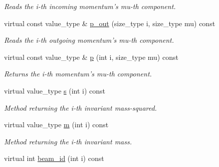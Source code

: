 \begin{DoxyCompactItemize}
\begin{DoxyCompactList}\small\item\em Reads the i-\/th incoming momentum's mu-\/th component. \end{DoxyCompactList}\item 
\hypertarget{a00442_a6ca6d42c507ab098658c2395ecf7a226}{virtual const value\-\_\-type \& \hyperlink{a00442_a6ca6d42c507ab098658c2395ecf7a226}{p\-\_\-out} (size\-\_\-type i, size\-\_\-type mu) const }\label{a00442_a6ca6d42c507ab098658c2395ecf7a226}

\begin{DoxyCompactList}\small\item\em Reads the i-\/th outgoing momentum's mu-\/th component. \end{DoxyCompactList}\item 
\hypertarget{a00442_ae50c1bc5dffde20bc9cfadb235c5b0e8}{virtual const value\-\_\-type \& \hyperlink{a00442_ae50c1bc5dffde20bc9cfadb235c5b0e8}{p} (int i, size\-\_\-type mu) const }\label{a00442_ae50c1bc5dffde20bc9cfadb235c5b0e8}

\begin{DoxyCompactList}\small\item\em Returns the i-\/th momentum's mu-\/th component. \end{DoxyCompactList}\item 
\hypertarget{a00442_a871734b21e34bf0b091362b93bf3e7d1}{virtual value\-\_\-type \hyperlink{a00442_a871734b21e34bf0b091362b93bf3e7d1}{s} (int i) const }\label{a00442_a871734b21e34bf0b091362b93bf3e7d1}

\begin{DoxyCompactList}\small\item\em Method returning the i-\/th invariant mass-\/squared. \end{DoxyCompactList}\item 
\hypertarget{a00442_abdc1d4c568e4e3b815064c3d639ad913}{virtual value\-\_\-type \hyperlink{a00442_abdc1d4c568e4e3b815064c3d639ad913}{m} (int i) const }\label{a00442_abdc1d4c568e4e3b815064c3d639ad913}

\begin{DoxyCompactList}\small\item\em Method returning the i-\/th invariant mass. \end{DoxyCompactList}\item 
\hypertarget{a00442_ab846d190acfc2bc65f2634f74c4d792c}{virtual int \hyperlink{a00442_ab846d190acfc2bc65f2634f74c4d792c}{beam\-\_\-id} (int i) const }\label{a00442_ab846d190acfc2bc65f2634f74c4d792c}


\end{DoxyCompactItemize}
